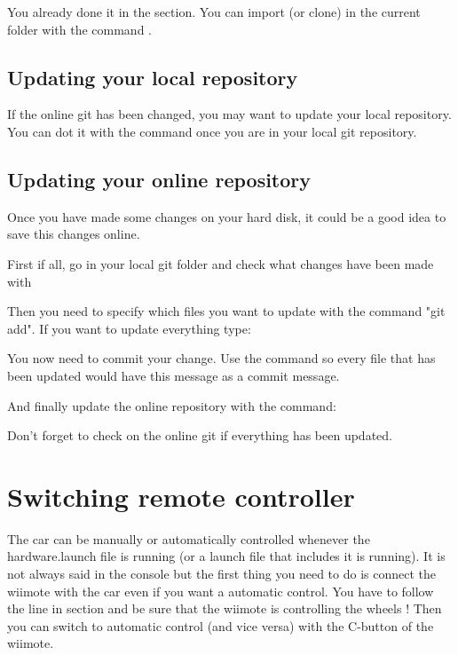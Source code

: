 You already done it in the  section. You can import (or clone) in the current folder with the command
.

\subsection{Updating your local repository}

If the online git has been changed, you may want to update your local repository. You can dot it with the command  once you are in your local git repository.

\subsection{Updating your online repository}

Once you have made some changes on your hard disk, it could be a good idea to save this changes online.

First if all, go in your local git folder and check what changes have been made with

Then you need to specify which files you want to update with the command "git add". If you want to update everything type:

You now need to commit your change. Use the command  so every file that has been updated would have this message as a commit message.

And finally update the online repository with the command: 

Don't forget to check on the online git if everything has been updated.


\section{Switching remote controller}
\label{sec:advanced_switch}

The car can be manually or automatically controlled whenever the hardware.launch file is running (or a launch file that includes it is running). It is not always said in the console but the first thing you need to do is connect the wiimote with the car even if you want a automatic control. You have to follow the line in section  and be sure that the wiimote is controlling the wheels ! Then you can switch to automatic control (and vice versa) with the C-button of the wiimote.

